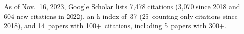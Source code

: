 %
As of Nov.~16, 2023, Google Scholar lists
7,478 citations (3,070 since 2018 and 604 new citations in 2022),
an h-index of~37 (25~counting only citations since 2018),
and 14~papers with 100+~citations, including 5~papers with 300+.
